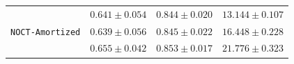 \begin{table}[ht]
\begin{center}
\begin{sc}
{\begin{tabular}{cccc}
        \multirow{3}{*}{\texttt{NOCT-Amortized}} 
& $0.641\pm0.054$ & $0.844\pm0.020$ & $13.144\pm0.107$ \\
& $0.639\pm0.056$ & $0.845\pm0.022$ & $16.448\pm0.228$ \\
& $0.655\pm0.042$ & $0.853\pm0.017$ & $21.776\pm0.323$ \\ \bottomrule

    \end{tabular}
    }
    \end{sc}

\end{center}
\vspace{-0.15in}

\end{table}
